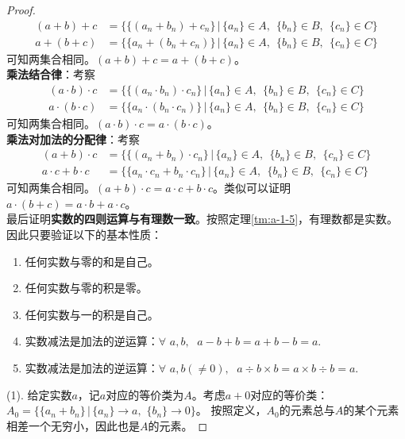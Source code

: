 \documentclass[12pt,UTF8,fontset=none]{ctexbook}
\begin{document}
\begin{appendix}
\begin{proof}
    \begin{align*}
        (a + b) + c &= \{\{(a_n + b_n) + c_n\} \, |\, \{a_n\}\in A,\;\,\{b_n\}\in B,\;\,\{c_n\}\in C \}  \\
        a + (b + c) &= \{\{a_n + (b_n + c_n)\} \, |\, \{a_n\}\in A,\;\,\{b_n\}\in B,\;\,\{c_n\}\in C \} 
    \end{align*}
    可知两集合相同。$(a + b) + c = a + (b + c)$。\\
    \textbf{乘法结合律}：考察
    \begin{align*}
        (a \cdot b) \cdot c &= \{\{(a_n \cdot b_n) \cdot c_n\} \, |\, \{a_n\}\in A,\;\,\{b_n\}\in B,\;\,\{c_n\}\in C \}  \\
        a \cdot (b \cdot c) &= \{\{a_n \cdot (b_n \cdot c_n)\} \, |\, \{a_n\}\in A,\;\,\{b_n\}\in B,\;\,\{c_n\}\in C \} 
    \end{align*}
    可知两集合相同。$(a \cdot b) \cdot c = a \cdot (b \cdot c)$。\\
    \textbf{乘法对加法的分配律}：考察
    \begin{align*}
        (a + b) \cdot c &= \{\{(a_n + b_n) \cdot c_n\} \, |\, \{a_n\}\in A,\;\,\{b_n\}\in B,\;\,\{c_n\}\in C \}  \\
        a \cdot c + b \cdot c &= \{\{a_n \cdot c_n + b_n \cdot c_n\} \, |\, \{a_n\}\in A,\;\,\{b_n\}\in B,\;\,\{c_n\}\in C \} 
    \end{align*}
    可知两集合相同。$(a + b) \cdot c = a \cdot c + b \cdot c$。类似可以证明$a \cdot (b + c) = a \cdot b + a \cdot c$。\\
    最后证明\textbf{实数的四则运算与有理数一致}。按照定理\ref{tm:a-1-5}，有理数都是实数。因此只要验证以下的基本性质：
    \begin{enumerate}
        \item 任何实数与零的和是自己。
        \item 任何实数与零的积是零。
        \item 任何实数与一的积是自己。
        \item 实数减法是加法的逆运算：$\forall \,\, a, b, \;\,\, a - b + b = a + b - b = a.$
        \item 实数减法是加法的逆运算：$\forall \,\, a, b(\neq 0), \;\,\, a \div b \times b = a\times b \div b = a.$
    \end{enumerate}
    (1). 给定实数$a$，记$a$对应的等价类为$A$。考虑$a+0$对应的等价类：$A_0 = \{ \{a_n + b_n\} \,|\, \{a_n\}\to a, \,\, \{b_n\} \to 0 \}$。
    按照定义，$A_0$的元素总与$A$的某个元素相差一个无穷小，因此也是$A$的元素。

\end{proof}
\end{appendix}
\end{document}
